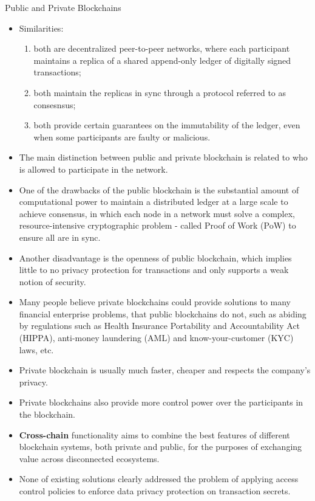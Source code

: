 \documentclass[11pt]{beamer}
\begin{document}
\begin{frame}[allowframebreaks]{Public and Private Blockchains}
\begin{itemize}
	\item Similarities\cite{jayachandran}:
	\begin{enumerate}
		\item both are decentralized peer-to-peer networks, where each participant maintains a replica of a shared append-only ledger of digitally signed transactions;
		\item both maintain the replicas in sync through a protocol referred to as consesnsus;
		\item both provide certain guarantees on the immutability of the ledger, even when some participants are faulty or malicious.	
	\end{enumerate}
	\item The main distinction between public and private blockchain is related to who is allowed to participate in the network.
	\item One of the drawbacks of the public blockchain is the substantial amount of computational power to maintain a distributed ledger at a large scale to achieve consensus, in which each node in a network must solve a complex, resource-intensive cryptographic problem - called Proof of Work (PoW)\cite{nakamoto2008} to ensure all are in sync.
	\item Another disadvantage is the openness of public blockchain, which implies little to no privacy protection for transactions and only supports a weak notion of security.
	\item Many people believe private blockchains could provide solutions to many financial enterprise problems, that public blockchains do not, such as abiding by regulations such as Health Insurance Portability and Accountability Act (HIPPA), anti-money laundering (AML) and know-your-customer (KYC) laws, etc.
	\item Private blockchain is usually much faster, cheaper and respects the company's privacy.
	\item  Private blockchains also provide more control power over the participants in the blockchain.
	\item \textbf{Cross-chain} functionality aims to combine the best features of different blockchain systems\cite{liebkind2018}, both private and public, for the purposes of exchanging value across disconnected ecosystems.
	\item None of existing solutions clearly addressed the problem of applying access control policies to enforce data privacy protection on transaction secrets.

\end{itemize}
\end{frame}
\end{document}
